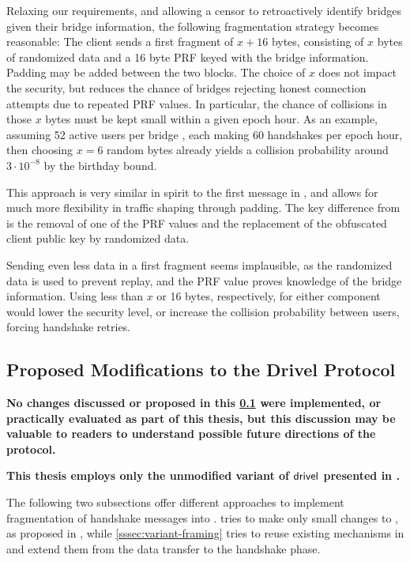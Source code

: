 Relaxing our requirements, and allowing a censor to retroactively identify bridges given their bridge information, the following fragmentation strategy becomes reasonable: The client sends a first fragment of $x+16$ bytes, consisting of $x$ bytes of randomized data and a 16 byte PRF keyed with the bridge information. Padding may be added between the two blocks. The choice of $x$ does not impact the security, but reduces the chance of bridges rejecting honest connection attempts due to repeated PRF values. In particular, the chance of collisions in those $x$ bytes must be kept small within a given epoch hour. As an example, assuming 52 active users per bridge \cite{tor-metrics}, each making 60 handshakes per epoch hour, then choosing $x=6$ random bytes already yields a collision probability around $3 \cdot 10^{-8}$ by the birthday bound.

This approach is very similar in spirit to the first message in \obfsfour{}, and allows for much more flexibility in traffic shaping through padding. The key difference from \obfsfour{} is the removal of one of the PRF values and the replacement of the obfuscated client public key by randomized data.

Sending even less data in a first fragment seems implausible, as the randomized data is used to prevent replay, and the PRF value proves knowledge of the bridge information. Using less than $x$ or 16 bytes, respectively, for either component would lower the security level, or increase the collision probability between users, forcing handshake retries.

\subsection{Proposed Modifications to the Drivel Protocol} \label{ssec:drivel-mod}

\textbf{No changes discussed or proposed in this \cref{ssec:drivel-mod} were implemented, or practically evaluated as part of this thesis, but this discussion may be valuable to readers to understand possible future directions of the protocol.}

\textbf{This thesis employs only the unmodified variant of $\textsf{drivel}{}$ presented in \cite[Figure~6]{EPRINT:GRSV25}.}

The following two subsections offer different approaches to implement fragmentation of handshake messages into \drivel{}.  tries to make only small changes to \drivel{}, as proposed in \cite[Figure~6]{EPRINT:GRSV25}, while \cref{sssec:variant-framing} tries to reuse existing mechanisms in \obfsfour{} and extend them from the data transfer to the handshake phase.

